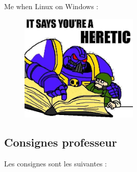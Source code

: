 \documentclass{article}
\begin{document}
	\begin{center}Me when Linux on Windows :
	\end{center}
	\begin{figure}[h]
		\centering
		\includegraphics[width=0.5\textwidth]{meme.png}
		\label{fig:meme}
	\end{figure}
	\newpage
	
	\subsection{Consignes professeur}
	
	Les consignes sont les suivantes : 
	
\end{document}
